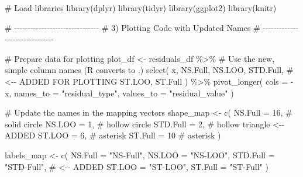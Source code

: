 \documentclass[
  letterpaper,
  DIV=11,
  numbers=noendperiod]{scrreprt}
\newenvironment{Shaded}{\begin{snugshade}}{\end{snugshade}}
\newcommand{\AttributeTok}[1]{\textcolor[rgb]{0.40,0.45,0.13}{#1}}
\newcommand{\CommentTok}[1]{\textcolor[rgb]{0.37,0.37,0.37}{#1}}
\newcommand{\DecValTok}[1]{\textcolor[rgb]{0.68,0.00,0.00}{#1}}
\newcommand{\FunctionTok}[1]{\textcolor[rgb]{0.28,0.35,0.67}{#1}}
\newcommand{\NormalTok}[1]{\textcolor[rgb]{0.00,0.23,0.31}{#1}}
\newcommand{\OtherTok}[1]{\textcolor[rgb]{0.00,0.23,0.31}{#1}}
\newcommand{\SpecialCharTok}[1]{\textcolor[rgb]{0.37,0.37,0.37}{#1}}
\newcommand{\StringTok}[1]{\textcolor[rgb]{0.13,0.47,0.30}{#1}}
\begin{document}
\begin{Shaded}
\begin{Highlighting}[]
\CommentTok{\# Load libraries}
\FunctionTok{library}\NormalTok{(dplyr)}
\FunctionTok{library}\NormalTok{(tidyr)}
\FunctionTok{library}\NormalTok{(ggplot2)}
\FunctionTok{library}\NormalTok{(knitr)}


\CommentTok{\# {-}{-}{-}{-}{-}{-}{-}{-}{-}{-}{-}{-}{-}{-}{-}{-}{-}{-}{-}{-}{-}{-}{-}{-}{-}{-}{-}{-}{-}{-}{-}}
\CommentTok{\# 3) Plotting Code with Updated Names}
\CommentTok{\# {-}{-}{-}{-}{-}{-}{-}{-}{-}{-}{-}{-}{-}{-}{-}{-}{-}{-}{-}{-}{-}{-}{-}{-}{-}{-}{-}{-}{-}{-}{-}}

\CommentTok{\# Prepare data for plotting}
\NormalTok{plot\_df }\OtherTok{\textless{}{-}}\NormalTok{ residuals\_df }\SpecialCharTok{\%\textgreater{}\%}
  \CommentTok{\# Use the new, simple column names (R converts \textquotesingle{}{-}\textquotesingle{} to \textquotesingle{}.\textquotesingle{})}
  \FunctionTok{select}\NormalTok{(}
\NormalTok{    x,}
\NormalTok{    NS.Full,}
\NormalTok{    NS.LOO,}
\NormalTok{    STD.Full, }\CommentTok{\# \textless{}{-}{-} ADDED FOR PLOTTING}
\NormalTok{    ST.LOO,}
\NormalTok{    ST.Full}
\NormalTok{  ) }\SpecialCharTok{\%\textgreater{}\%}
  \FunctionTok{pivot\_longer}\NormalTok{(}
    \AttributeTok{cols =} \SpecialCharTok{{-}}\NormalTok{x,}
    \AttributeTok{names\_to =} \StringTok{"residual\_type"}\NormalTok{,}
    \AttributeTok{values\_to =} \StringTok{"residual\_value"}
\NormalTok{  )}

\CommentTok{\# Update the names in the mapping vectors}
\NormalTok{shape\_map }\OtherTok{\textless{}{-}} \FunctionTok{c}\NormalTok{(}
  \AttributeTok{NS.Full  =} \DecValTok{16}\NormalTok{,  }\CommentTok{\# solid circle}
  \AttributeTok{NS.LOO   =} \DecValTok{1}\NormalTok{,   }\CommentTok{\# hollow circle}
  \AttributeTok{STD.Full =} \DecValTok{2}\NormalTok{,   }\CommentTok{\# hollow triangle \textless{}{-}{-} ADDED}
  \AttributeTok{ST.LOO   =} \DecValTok{6}\NormalTok{,   }\CommentTok{\# asterisk}
  \AttributeTok{ST.Full  =} \DecValTok{10}   \CommentTok{\# asterisk}
\NormalTok{)}

\NormalTok{labels\_map }\OtherTok{\textless{}{-}} \FunctionTok{c}\NormalTok{(}
  \AttributeTok{NS.Full  =} \StringTok{"NS{-}Full"}\NormalTok{,}
  \AttributeTok{NS.LOO   =} \StringTok{"NS{-}LOO"}\NormalTok{,}
  \AttributeTok{STD.Full =} \StringTok{"STD{-}Full"}\NormalTok{, }\CommentTok{\# \textless{}{-}{-} ADDED}
  \AttributeTok{ST.LOO   =} \StringTok{"ST{-}LOO"}\NormalTok{,}
  \AttributeTok{ST.Full  =} \StringTok{"ST{-}Full"}
\NormalTok{)}


\end{Highlighting}
\end{Shaded}
\end{document}
